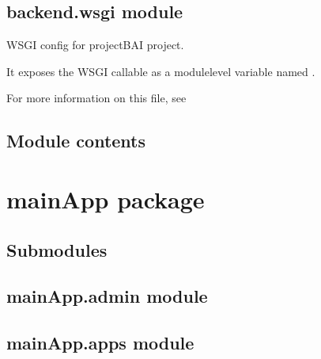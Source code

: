 \documentclass[letterpaper,11pt,polish]{sphinxmanual}
\begin{document}
\subsection{backend.wsgi module}
\label{\detokenize{backend:module-backend.wsgi}}\label{\detokenize{backend:backend-wsgi-module}}
\sphinxAtStartPar
WSGI config for projectBAI project.

\sphinxAtStartPar
It exposes the WSGI callable as a module\sphinxhyphen{}level variable named .

\sphinxAtStartPar
For more information on this file, see


\subsection{Module contents}
\label{\detokenize{backend:module-backend}}\label{\detokenize{backend:module-contents}}
\sphinxstepscope


\section{mainApp package}
\label{\detokenize{mainApp:mainapp-package}}\label{\detokenize{mainApp::doc}}

\subsection{Submodules}
\label{\detokenize{mainApp:submodules}}

\subsection{mainApp.admin module}
\label{\detokenize{mainApp:module-mainApp.admin}}\label{\detokenize{mainApp:mainapp-admin-module}}

\subsection{mainApp.apps module}
\label{\detokenize{mainApp:module-mainApp.apps}}\label{\detokenize{mainApp:mainapp-apps-module}}
\end{document}
